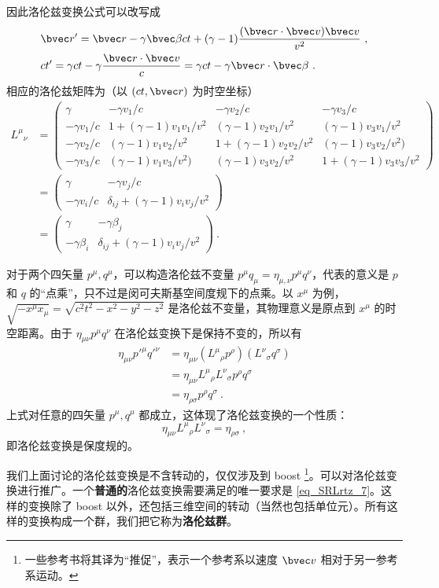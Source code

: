 因此洛伦兹变换公式可以改写成
\begin{equation}
\begin{aligned}
&\bvec r'=\bvec r-\gamma\bvec \beta ct+(\gamma-1)\frac{(\bvec r\cdot \bvec v)\bvec v}{v^2}~,\\
&ct'=\gamma ct-\gamma\frac{\bvec r\cdot\bvec v}{c}=\gamma ct-\gamma \bvec r\cdot\bvec \beta~.
\end{aligned}
\end{equation}
相应的洛伦兹矩阵为（以 $(ct,\bvec r)$ 为时空坐标）
\begin{equation}\label{eq_SRLrtz_6}
\begin{aligned}
{L^\mu}_\nu&=
\left(\begin{matrix}
\gamma& -\gamma v_1/c & -\gamma v_2/c& -\gamma v_3/c\\
-\gamma v_1/c&1+(\gamma-1)v_1v_1/v^2& (\gamma-1)v_2v_1/v^2&(\gamma-1)v_3v_1/v^2\\
-\gamma v_2/c &(\gamma-1)v_1v_2/v^2&1+(\gamma-1)v_2v_2/v^2&(\gamma-1)v_3v_2/v^2)\\
-\gamma v_3/c&(\gamma-1)v_1v_3/v^2)&(\gamma-1)v_3v_2/v^2&1+(\gamma-1)v_3v_3/v^2
\end{matrix}\right)\\
&=\left(\begin{matrix}
\gamma & -\gamma v_j/c \\
-\gamma v_i/c & \delta_{ij}+(\gamma-1)v_iv_j/v^2
\end{matrix}
\right)\\
&=\left(\begin{matrix}
\gamma & -\gamma \beta_j \\
-\gamma \beta_i & \delta_{ij}+(\gamma-1)v_iv_j/v^2
\end{matrix}
\right)~.
\end{aligned}
\end{equation}

对于两个四矢量 $p^\mu,q^\mu$，可以构造洛伦兹不变量 $p^\mu q_\mu=\eta_{\mu,\nu}p^\mu q^\nu$，代表的意义是 $p$ 和 $q$ 的“点乘”，只不过是闵可夫斯基空间度规下的点乘。以 $x^\mu$ 为例，$\sqrt{-x^\mu x_\mu}=\sqrt{c^2t^2-x^2-y^2-z^2}$ 是洛伦兹不变量，其物理意义是原点到 $x^\mu$ 的时空距离。由于 $\eta_{\mu\nu}p^\mu q^\nu$ 在洛伦兹变换下是保持不变的，所以有
\begin{equation}
\begin{aligned}
\eta_{\mu\nu}p'^\mu q'^\nu&=\eta_{\mu\nu}({L^\mu}_\rho p^\rho) ({L^\nu}_\sigma q^\sigma)\\
&=\eta_{\mu\nu}{L^\mu}_\rho {L^\nu}_\sigma p^\rho q^\sigma
\\
&=\eta_{\rho\sigma} p^\rho q^\sigma~.
\end{aligned}
\end{equation}
上式对任意的四矢量 $p^\mu,q^\mu$ 都成立，这体现了洛伦兹变换的一个性质：
\begin{equation}\label{eq_SRLrtz_7}
\eta_{\mu\nu}{L^\mu}_\rho {L^\nu}_\sigma=\eta_{\rho\sigma}~,
\end{equation}
即洛伦兹变换是保度规的。

我们上面讨论的洛伦兹变换是不含转动的，仅仅涉及到 boost \footnote{一些参考书将其译为“推促”，表示一个参考系以速度 $\bvec v$ 相对于另一参考系运动。}。可以对洛伦兹变换进行推广。一个\textbf{普通的}洛伦兹变换需要满足的唯一要求是 \autoref{eq_SRLrtz_7}。这样的变换除了 boost 以外，还包括三维空间的转动（当然也包括单位元）。所有这样的变换构成一个群，我们把它称为\textbf{洛伦兹群}。

